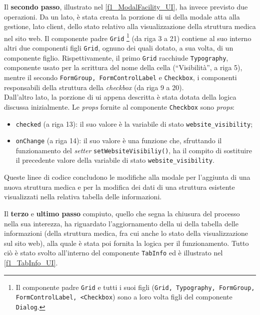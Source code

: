 Il \textbf{secondo passo}, illustrato nel \autoref{f1_ModalFacility_UI}, ha invece previsto due operazioni. Da un lato, è stata creata la porzione di \acrshort{ui} della modale atta alla gestione, lato client, dello stato relativo alla visualizzazione della struttura medica nel sito web. Il componente padre \texttt{Grid} \footnote{Il componente padre \texttt{Grid} e tutti i suoi figli (\texttt{Grid, Typography, FormGroup, FormControlLabel, <Checkbox}) sono a loro volta figli del componente \texttt{Dialog}.} (da riga 3 a 21) contiene al suo interno altri due componenti figli \texttt{Grid}, ognuno dei quali dotato, a sua volta, di un componente figlio. Rispettivamente, il primo \texttt{Grid} racchiude \texttt{Typography}, componente usato per la scrittura del nome della cella (“Visibilità”, a riga 5), mentre il secondo \texttt{FormGroup, FormControlLabel} e \texttt{Checkbox}, i componenti responsabili della struttura della \textit{checkbox} (da riga 9 a 20).\\
Dall'altro lato, la porzione di \acrshort{ui} appena descritta è stata dotata della logica discussa inizialmente. Le \textit{props} fornite al componente \texttt{Checkbox} sono \textit{props}:
\begin{itemize}
    \item \texttt{checked} (a riga 13): il suo valore è la variabile di stato \texttt{website\_visibility};
    
    \item \texttt{onChange} (a riga 14): il suo valore è una funzione che, sfruttando il funzionamento del \textit{setter} \texttt{setWebsiteVisibiliy()}, ha il compito di sostituire il precedente valore della variabile di stato \texttt{website\_visibility}.
\end{itemize}
Queste linee di codice concludono le modifiche alla modale per l'aggiunta di una nuova struttura medica e per la modifica dei dati di una struttura esistente visualizzati nella relativa tabella delle informazioni.



Il \textbf{terzo} e \textbf{ultimo passo} compiuto, quello che segna la chiusura del processo nella sua interezza, ha riguardato l'aggiornamento della \acrshort{ui} della tabella delle informazioni (della struttura medica, fra cui anche lo stato della visualizzazione sul sito web), alla quale è stata poi fornita la logica per il funzionamento. Tutto ciò è stato svolto all'interno del componente \texttt{TabInfo} ed è illustrato nel \autoref{f1_TabInfo_UI}.

